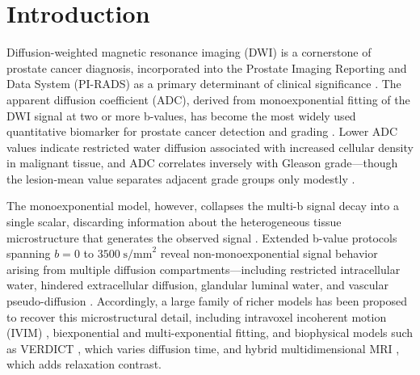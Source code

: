 \section{Introduction}

Diffusion-weighted magnetic resonance imaging (DWI) is a cornerstone of prostate cancer diagnosis, incorporated into the Prostate Imaging Reporting and Data System (PI-RADS) as a primary determinant of clinical significance \citep{turkbey2019prostate}.
The apparent diffusion coefficient (ADC), derived from monoexponential fitting of the DWI signal at two or more b-values, has become the most widely used quantitative biomarker for prostate cancer detection and grading \citep{manetta2019correlation, yan2024value}.
Lower ADC values indicate restricted water diffusion associated with increased cellular density in malignant tissue, and ADC correlates inversely with Gleason grade---though the lesion-mean value separates adjacent grade groups only modestly \citep{donati2014prostate, rosenkrantz2015whole}.

The monoexponential model, however, collapses the multi-b signal decay into a single scalar, discarding information about the heterogeneous tissue microstructure that generates the observed signal \citep{fennessy2023quantitative}.
Extended b-value protocols spanning $b = 0$ to $3500\;\text{s/mm}^2$ reveal non-monoexponential signal behavior arising from multiple diffusion compartments---including restricted intracellular water, hindered extracellular diffusion, glandular luminal water, and vascular pseudo-diffusion \citep{langkilde2018evaluation}.
Accordingly, a large family of richer models has been proposed to recover this microstructural detail, including intravoxel incoherent motion (IVIM) \citep{lebihan1988separation}, biexponential \citep{mulkern2006biexponential} and multi-exponential \citep{conlin2021improved} fitting, and biophysical models such as VERDICT \citep{panagiotaki2014microstructural}, which varies diffusion time, and hybrid multidimensional MRI \citep{chatterjee2018hybrid}, which adds relaxation contrast.

